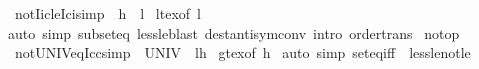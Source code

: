\begin{isabellebody}
\endisatagproof
{\isafoldproof}%
%
\isadelimproof
\isanewline
%
\endisadelimproof
\isanewline
{}\isamarkupfalse%
\ not{\isacharunderscore}{\kern0pt}Iic{\isacharunderscore}{\kern0pt}le{\isacharunderscore}{\kern0pt}Ici{\isacharbrackleft}{\kern0pt}simp{\isacharbrackright}{\kern0pt}{\isacharcolon}{\kern0pt}\ {\isachardoublequoteopen}{\isasymnot}\ {\isacharbraceleft}{\kern0pt}{\isachardot}{\kern0pt}{\isachardot}{\kern0pt}h{\isacharbraceright}{\kern0pt}\ {\isasymsubseteq}\ {\isacharbraceleft}{\kern0pt}l{\isacharprime}{\kern0pt}{\isachardot}{\kern0pt}{\isachardot}{\kern0pt}{\isacharbraceright}{\kern0pt}{\isachardoublequoteclose}\isanewline
%
\isadelimproof
%
\endisadelimproof
%
\isatagproof
{}\isamarkupfalse%
\ lt{\isacharunderscore}{\kern0pt}ex{\isacharbrackleft}{\kern0pt}of\ l{\isacharprime}{\kern0pt}{\isacharbrackright}{\kern0pt}\isanewline
{}\isamarkupfalse%
{\isacharparenleft}{\kern0pt}auto\ simp{\isacharcolon}{\kern0pt}\ subset{\isacharunderscore}{\kern0pt}eq\ less{\isacharunderscore}{\kern0pt}le{\isacharparenright}{\kern0pt}{\isacharparenleft}{\kern0pt}blast\ dest{\isacharcolon}{\kern0pt}antisym{\isacharunderscore}{\kern0pt}conv\ intro{\isacharcolon}{\kern0pt}\ order{\isacharunderscore}{\kern0pt}trans{\isacharparenright}{\kern0pt}%
\endisatagproof
{\isafoldproof}%
%
\isadelimproof
\isanewline
%
\endisadelimproof
\isanewline
{}\isamarkupfalse%
\isanewline
\isanewline
\isanewline
{}\isamarkupfalse%
\ no{\isacharunderscore}{\kern0pt}top\isanewline
{}\isanewline
\isanewline
\isanewline
{}\isamarkupfalse%
\ not{\isacharunderscore}{\kern0pt}UNIV{\isacharunderscore}{\kern0pt}eq{\isacharunderscore}{\kern0pt}Icc{\isacharbrackleft}{\kern0pt}simp{\isacharbrackright}{\kern0pt}{\isacharcolon}{\kern0pt}\ {\isachardoublequoteopen}{\isasymnot}\ UNIV\ {\isacharequal}{\kern0pt}\ {\isacharbraceleft}{\kern0pt}l{\isacharprime}{\kern0pt}{\isachardot}{\kern0pt}{\isachardot}{\kern0pt}h{\isacharprime}{\kern0pt}{\isacharbraceright}{\kern0pt}{\isachardoublequoteclose}\isanewline
%
\isadelimproof
%
\endisadelimproof
%
\isatagproof
{}\isamarkupfalse%
\ gt{\isacharunderscore}{\kern0pt}ex{\isacharbrackleft}{\kern0pt}of\ h{\isacharprime}{\kern0pt}{\isacharbrackright}{\kern0pt}\ \isamarkupfalse%
{\isacharparenleft}{\kern0pt}auto\ simp{\isacharcolon}{\kern0pt}\ set{\isacharunderscore}{\kern0pt}eq{\isacharunderscore}{\kern0pt}iff\ \ less{\isacharunderscore}{\kern0pt}le{\isacharunderscore}{\kern0pt}not{\isacharunderscore}{\kern0pt}le{\isacharparenright}{\kern0pt}%

\end{isabellebody}
